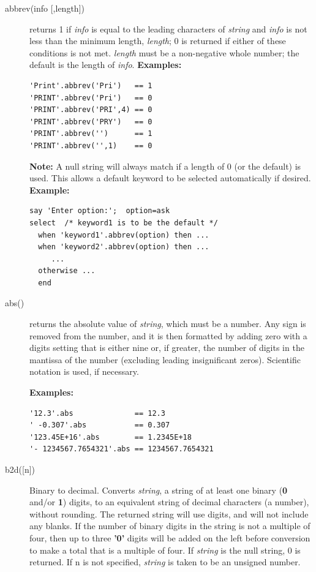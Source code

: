 \begin{description}
\item[abbrev(info [,length{]})]\label{refabbrev}
returns 1 if \emph{info} is equal to the leading characters of
\emph{string} and \emph{info} is not less than
the minimum length, \emph{length}; 0 is returned
if either of these conditions is not met.
\emph{length} must be a non-negative whole number; the default is
the length of \emph{info}.
 \textbf{Examples:}
\begin{lstlisting}
'Print'.abbrev('Pri')   == 1
'PRINT'.abbrev('Pri')   == 0
'PRINT'.abbrev('PRI',4) == 0
'PRINT'.abbrev('PRY')   == 0
'PRINT'.abbrev('')      == 1
'PRINT'.abbrev('',1)    == 0
\end{lstlisting}
\textbf{Note: }A null string will always match if a length of 0 (or the default)
is used.
This allows a default keyword to be selected automatically if desired.
 \textbf{Example:}
\begin{lstlisting}
say 'Enter option:';  option=ask
select  /* keyword1 is to be the default */
  when 'keyword1'.abbrev(option) then ...
  when 'keyword2'.abbrev(option) then ...
     ...
  otherwise ...
  end
\end{lstlisting}
\item[abs()]\label{refabs}
returns the absolute value of \emph{string}, which must be a
number.
 Any sign is removed from the number, and it is then formatted by adding
zero with a digits setting that is either nine or, if greater, the
number of digits in the mantissa of the number (excluding leading
insignificant zeros).
Scientific notation is used, if necessary.
 
\textbf{Examples:}
\begin{lstlisting}
'12.3'.abs              == 12.3
' -0.307'.abs           == 0.307
'123.45E+16'.abs        == 1.2345E+18
'- 1234567.7654321'.abs == 1234567.7654321
\end{lstlisting}

\item[b2d([n{]})]\label{refb2x}
Binary to decimal.
Converts \emph{string}, a string of at least one binary
(\textbf{0} and/or \textbf{1}) digits, to an equivalent string of
decimal characters (a number), without rounding.
The returned string will use digits,
and will not include any blanks.
 If the number of binary digits in the string is not a multiple of four,
then up to three \textbf{'0'} digits will be added on the left before
conversion to make a total that is a multiple of four.
 If \emph{string} is the null string, 0 is returned. If n is not specified, \emph{string} is taken to be an unsigned number.


\end{description}
